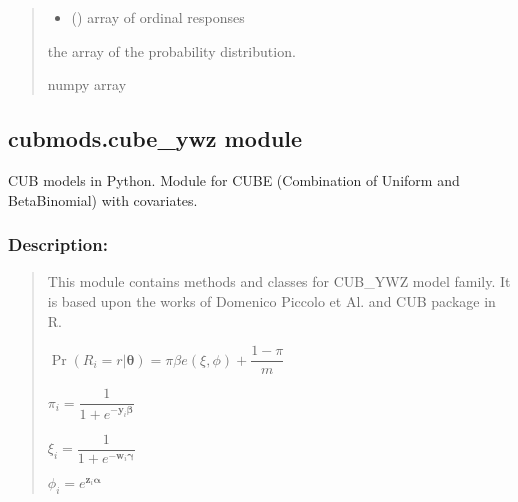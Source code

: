 \documentclass[letterpaper,10pt,english]{sphinxmanual}
\begin{document}
\begin{fulllineitems}
\begin{quote}
\begin{description}
\begin{itemize}
\item {} 
\sphinxAtStartPar
{} () \textendash{} array of ordinal responses

\end{itemize}

\sphinxAtStartPar
the array of the probability distribution.

\sphinxAtStartPar
numpy array

\end{description}\end{quote}

\end{fulllineitems}



\subsection{cubmods.cube\_ywz module}
\label{\detokenize{cubmods:module-cubmods.cube_ywz}}\label{\detokenize{cubmods:cubmods-cube-ywz-module}}\label{\detokenize{cubmods:cubeywz-module}}
\sphinxAtStartPar
CUB models in Python.
Module for CUBE (Combination of Uniform
and Beta\sphinxhyphen{}Binomial) with covariates.


\subsubsection{Description:}
\label{\detokenize{cubmods:id290}}\begin{quote}

\sphinxAtStartPar
This module contains methods and classes
for CUB\_YWZ model family.
It is based upon the works of Domenico
Piccolo et Al. and CUB package in R.

\sphinxAtStartPar
\(\Pr(R_i=r|\pmb{\theta}) = \pi \beta e(\xi,\phi)+\dfrac{1-\pi}{m}\)

\sphinxAtStartPar
\(\pi_i = \dfrac{1}{1+e^{-\pmb y_i \pmb \beta}}\)

\sphinxAtStartPar
\(\xi_i = \dfrac{1}{1+e^{-\pmb w_i \pmb \gamma}}\)

\sphinxAtStartPar
\(\phi_i = e^{\pmb z_i \pmb \alpha}\)
\end{quote}
\end{document}
